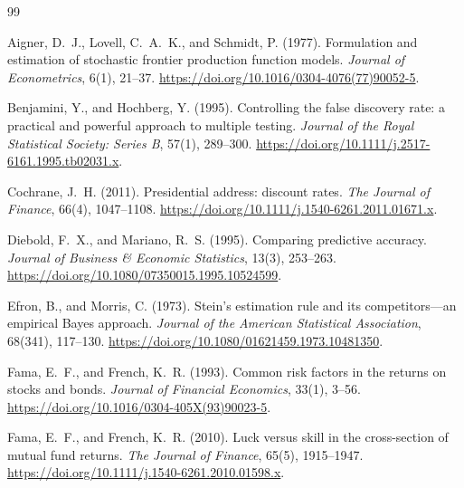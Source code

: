 \documentclass[11pt]{article}
\begin{document}
\begin{thebibliography}{99}

Aigner, D.\ J., Lovell, C.\ A.\ K., and Schmidt, P. (1977).
Formulation and estimation of stochastic frontier production function models.
\textit{Journal of Econometrics}, 6(1), 21--37.
\href{https://doi.org/10.1016/0304-4076(77)90052-5}{https://doi.org/10.1016/0304-4076(77)90052-5}.

Benjamini, Y., and Hochberg, Y. (1995).
Controlling the false discovery rate: a practical and powerful approach to
multiple testing.
\textit{Journal of the Royal Statistical Society: Series B}, 57(1), 289--300.
\href{https://doi.org/10.1111/j.2517-6161.1995.tb02031.x}{https://doi.org/10.1111/j.2517-6161.1995.tb02031.x}.

Cochrane, J.\ H. (2011).
Presidential address: discount rates.
\textit{The Journal of Finance}, 66(4), 1047--1108.
\href{https://doi.org/10.1111/j.1540-6261.2011.01671.x}{https://doi.org/10.1111/j.1540-6261.2011.01671.x}.

Diebold, F.\ X., and Mariano, R.\ S. (1995).
Comparing predictive accuracy.
\textit{Journal of Business \& Economic Statistics}, 13(3), 253--263.
\href{https://doi.org/10.1080/07350015.1995.10524599}{https://doi.org/10.1080/07350015.1995.10524599}.

Efron, B., and Morris, C. (1973).
Stein's estimation rule and its competitors---an empirical Bayes approach.
\textit{Journal of the American Statistical Association}, 68(341), 117--130.
\href{https://doi.org/10.1080/01621459.1973.10481350}{https://doi.org/10.1080/01621459.1973.10481350}.

Fama, E.\ F., and French, K.\ R. (1993).
Common risk factors in the returns on stocks and bonds.
\textit{Journal of Financial Economics}, 33(1), 3--56.
\href{https://doi.org/10.1016/0304-405X(93)90023-5}{https://doi.org/10.1016/0304-405X(93)90023-5}.

Fama, E.\ F., and French, K.\ R. (2010).
Luck versus skill in the cross-section of mutual fund returns.
\textit{The Journal of Finance}, 65(5), 1915--1947.
\href{https://doi.org/10.1111/j.1540-6261.2010.01598.x}{https://doi.org/10.1111/j.1540-6261.2010.01598.x}.


\end{thebibliography}
\end{document}
